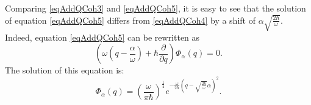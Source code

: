 Comparing \eqref{eqAddQCoh3} and \eqref{eqAddQCoh5}, it is easy to see that
the solution of equation \eqref{eqAddQCoh5} differs from \eqref{eqAddQCoh4}
by a shift of 
$\alpha\sqrt{\frac{2\hbar}{\omega}}$. Indeed, equation
\eqref{eqAddQCoh5} can be rewritten as
\begin{equation}
\left(
\omega \left(q - \frac{\alpha}{\omega}\right) + \hbar \frac{\partial}{\partial q}
\right) \Phi_{\alpha}\left(q\right) = 0.
\nonumber
\end{equation}
The solution of this equation is:
\begin{equation}
\Phi_{\alpha}\left(q\right) = \left(\frac{\omega}{\pi
  \hbar}\right)^{\frac{1}{4}} e^{-\frac{\omega}{2
    \hbar}\left(q-\sqrt{\frac{2\hbar}{\omega}}\alpha\right)^2}. 
\label{eqAddQCoh7}
\end{equation}

